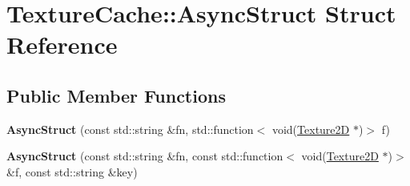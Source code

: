 \hypertarget{structTextureCache_1_1AsyncStruct}{}\section{Texture\+Cache\+:\+:Async\+Struct Struct Reference}
\label{structTextureCache_1_1AsyncStruct}
\subsection*{Public Member Functions}
\begin{DoxyCompactItemize}
\item 
\mbox{\label{structTextureCache_1_1AsyncStruct_a8d41ad062ccd79443307fe709db76f61}} 
{\bfseries Async\+Struct} (const std\+::string \&fn, std\+::function$<$ void(\hyperlink{classTexture2D}{Texture2D} $\ast$)$>$ f)
\item 
\mbox{\label{structTextureCache_1_1AsyncStruct_afb43db5f36622068d0e4467102290eed}} 
{\bfseries Async\+Struct} (const std\+::string \&fn, const std\+::function$<$ void(\hyperlink{classTexture2D}{Texture2D} $\ast$)$>$ \&f, const std\+::string \&key)
\end{DoxyCompactItemize}
